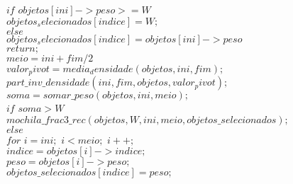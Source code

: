 \documentclass[10pt,a4paper]{article}
\begin{document}
	\hspace{1cm}$if$ $objetos[ini]->peso >= W$\\
	
	\hspace{3cm}$objetos_selecionados[indice] = W;$\\
	
	\hspace{2cm}$else$\\
	
	\hspace{3cm}$objetos_selecionados[indice] =objetos[ini]->peso $\\
	
	\hspace{2cm}$return;$\\
	
	\hspace{1cm}$meio = ini+fim/2$\\
	
	\hspace{1cm}$valor_pivot = media_densidade(objetos, ini, fim);$\\
	
	\hspace{1cm}$part\_inv\_densidade(ini,fim,objetos,valor_pivot);$\\
	
	\hspace{1cm}$soma = somar\_peso(objetos,ini,meio);$\\
	
	\hspace{1cm}$if$ $soma > W$\\
	
	\hspace{2cm}$mochila\_frac3\_rec(objetos,W,ini, meio, objetos\_selecionados);$\\
	
	\hspace{1cm}$else$\\
	
	\hspace{2cm}$for$ $i=ini;$ $i<meio;$ $i++;$\\
	
	\hspace{3cm}$indice = objetos[i]->indice;$\\
	
	\hspace{3cm}$peso = objetos[i]->peso;$\\
	
	\hspace{3cm}$objetos\_selecionados[indice] = peso;$\\
	
\end{document}
